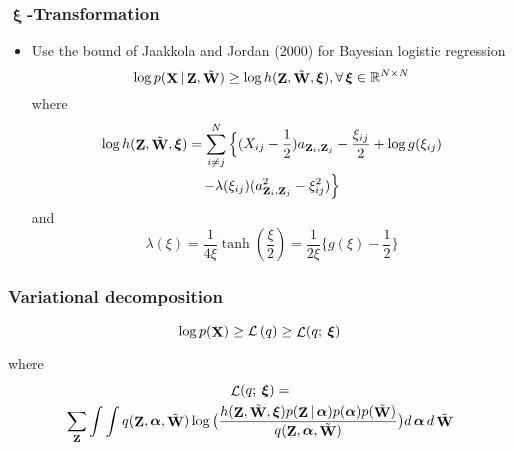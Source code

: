 \documentclass{beamer}
\newcommand{\rr}{\mathbb{R}}
\DeclareMathOperator{\bZ}{{\bf Z}}
\DeclareMathOperator{\bX}{{\bf X}}
\DeclareMathOperator{\bW}{{\bf W}}
\DeclareMathOperator{\btW}{\tilde{\bW}}
\DeclareMathOperator{\LowerBound}{\mathcal{L}}
\DeclareMathOperator{\balpha}{\boldsymbol{\alpha}}
\DeclareMathOperator{\bxi}{\boldsymbol{\xi}}
\begin{document}
\begin{frame}\frametitle{$\bxi$-Transformation}
  \begin{itemize}
  \item Use the bound of Jaakkola and Jordan (2000) for Bayesian logistic regression
    \begin{equation*}
      \log p(\bX|\bZ,\btW) \geq \log h(\bZ, \btW, \bxi),\forall \bxi \in \rr^{N \times N}
    \end{equation*}
    where 
    \begin{multline*}
      \log h(\bZ, \btW, \bxi) =  \sum_{i \neq j}^{N}\Big\{(X_{ij}-\frac{1}{2})a_{\bZ_{i},\bZ_{j}} - \frac{\xi_{ij}}{2} + \log g(\xi_{ij}) \\- \lambda(\xi_{ij})(a_{\bZ_{i},\bZ_{j}}^{2} - \xi_{ij}^{2})\Big\}
    \end{multline*}
    and 
    \begin{equation*}
      \lambda(\xi)   =  \frac{1}{4  \xi}   \tanh  (\frac{\xi}{2})  =
      \frac{1}{2  \xi}\big\{g(\xi)  - \frac{1}{2}\big\}
    \end{equation*}
  \end{itemize}
\end{frame}

\begin{frame}
\frametitle{Variational decomposition}


\begin{equation*}
 \log p(\bX) \geq  \mathcal{L}\left(q\right) \geq \LowerBound(q;\:\bxi)
\end{equation*}

where
\begin{multline*}
    \LowerBound(q;\: \bxi) = \\ \sum_{\bZ} \int \int q(\bZ, \balpha, \btW) \log\big(\frac{h(\bZ, \btW, \bxi)p(\bZ|\balpha)p(\balpha)p(\btW)}{q(\bZ, \balpha, \btW)}\big) d\balpha d\btW
  \end{multline*}


\end{frame}
\end{document}
